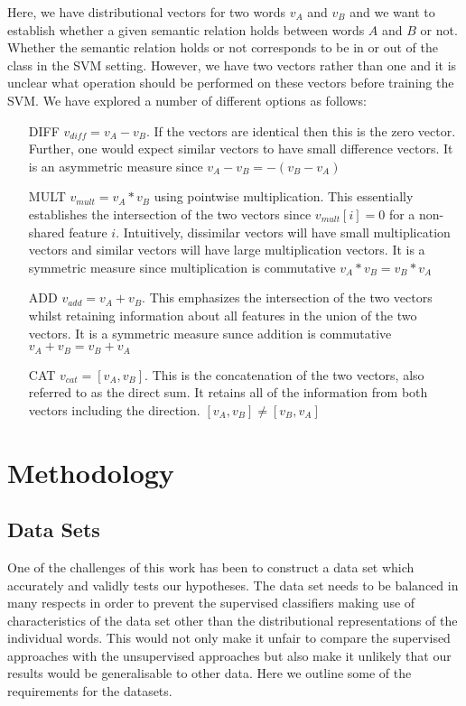 \documentclass[11pt]{article}
\begin{document}
Here, we have distributional vectors for two words $v_A$ and $v_B$ and we want to establish whether a given semantic relation holds between words $A$ and $B$ or not.  Whether the semantic relation holds or not corresponds to be in or out of the class in the SVM setting.  However, we have two vectors rather than one and it is unclear what operation should be performed on these vectors before training the SVM.  We have explored a number of different options as follows:

\begin{itemize}
\item[DIFF]{$v_{diff} = v_A - v_B$.  If the vectors are identical then this is the zero vector.  Further, one would expect similar vectors to have small difference vectors.  It is an asymmetric measure since $v_A - v_B = -(v_B - v_A)$ }
\item[MULT]{$v_{mult} = v_A * v_B$ using pointwise multiplication.  This essentially establishes the intersection of the two vectors since $v_{mult}[i] = 0$ for a non-shared feature $i$.   Intuitively,  dissimilar vectors will have small multiplication vectors and similar vectors will have large multiplication vectors.  It is a symmetric measure since multiplication is commutative $v_A * v_B = v_B * v_A$ }
\item[ADD]{$v_{add} = v_A + v_B$.  This emphasizes the intersection of the two vectors whilst retaining information about all features in the union of the two vectors.  It is a symmetric measure sunce addition is commutative $v_A + v_B = v_B + v_A$}
\item[CAT]{$v_{cat} = [v_A,v_B]$.  This is the concatenation of the two vectors, also referred to as the direct sum.  It retains all of the information from both vectors including the direction.    $[v_A,v_B] \neq [v_B,v_A]$}
\end{itemize}

\section{Methodology}

\subsection{Data Sets}

One of the challenges of this work has been to construct a data set which accurately and validly tests our hypotheses.  The data set needs to be balanced in many respects in order to prevent the supervised classifiers making use of characteristics of the data set other than the distributional representations of the individual words.  This would not only make it unfair to compare the supervised approaches with the unsupervised approaches but also make it unlikely that our results would be generalisable to other data.  Here we outline some of the requirements for the datasets.
\end{document}
